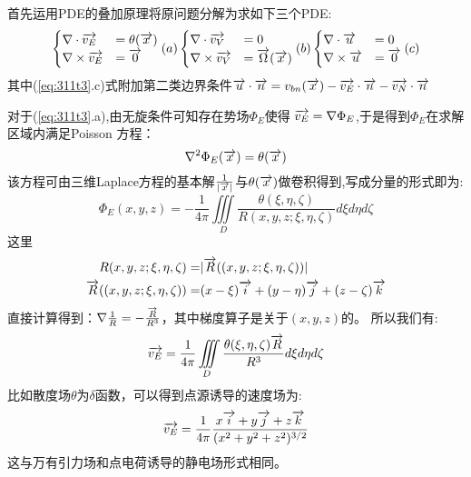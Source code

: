 首先运用PDE的叠加原理将原问题分解为求如下三个PDE:
\begin{equation}\label{eq:311t3}
\begin{cases}
\nabla \cdot \overrightarrow{v_E} &=\theta (\overrightarrow{x})\\
\nabla \times \overrightarrow{v_E} &=\overrightarrow{0}\\
\end{cases}(a)
\begin{cases}
\nabla \cdot \overrightarrow{v_V} &=0\\
\nabla \times \overrightarrow{v_V} &=\overrightarrow{\Omega}(\overrightarrow{x})\\
\end{cases}(b)
\begin{cases}
\nabla \cdot \overrightarrow{u} &=0\\
\nabla \times \overrightarrow{u} &=\overrightarrow{0}\\
\end{cases}(c)
\end{equation}
其中(\ref{eq:311t3}.c)式附加第二类边界条件$\overrightarrow{u}\cdot \overrightarrow{n} =v_{bn}(\overrightarrow{x})-\overrightarrow{v_E}\cdot \overrightarrow{n}-\overrightarrow{v_N}\cdot \overrightarrow{n}$

对于(\ref{eq:311t3}.a),由无旋条件可知存在势场$\Phi_E$使得 $\overrightarrow{v_E}=\nabla \Phi_E$,于是得到$\Phi_E$在求解区域内满足Poisson 方程：
\begin{equation}
\nabla^2 \Phi_E(\overrightarrow{x})=\theta(\overrightarrow{x})
\end{equation}
该方程可由三维Laplace方程的基本解$\frac{1}{|\overrightarrow{x}|}$与$\theta(\overrightarrow{x})$做卷积得到\cite{FundamentalSolution},写成分量的形式即为:
\begin{equation}\label{eq:31similar}
\Phi_E(x,y,z)=-\frac{1}{4\pi} \iiint\limits_D \frac{\theta(\xi,\eta,\zeta)}{R(x,y,z;\xi,\eta,\zeta)}d\xi d\eta d\zeta
\end{equation}
这里
\begin{align}
R(x,y,z;\xi,\eta,\zeta)=&|\overrightarrow{R}((x,y,z;\xi,\eta,\zeta))|\\
\overrightarrow{R}((x,y,z;\xi,\eta,\zeta))=&(x-\xi)\overrightarrow{i}+(y-\eta)\overrightarrow{j}+(z-\zeta)\overrightarrow{k}
\end{align}
直接计算得到：$\nabla \frac{1}{R}=-\frac{\overrightarrow{R}}{R^3}$，其中梯度算子是关于$(x,y,z)$的。
所以我们有:
\begin{equation}
\overrightarrow{v_E}=\frac{1}{4\pi} \iiint\limits_D \frac{\theta(\xi,\eta,\zeta)\overrightarrow{R}}{R^3}d\xi d\eta d\zeta
\end{equation}
比如散度场$\theta$为$\delta$函数，可以得到点源诱导的速度场为:
\begin{equation}
\overrightarrow{v_E}=\frac{1}{4\pi} \frac{x\overrightarrow{i}+y\overrightarrow{j}+z\overrightarrow{k}}{(x^2+y^2+z^2)^{3/2}}
\end{equation}
这与万有引力场和点电荷诱导的静电场形式相同。

